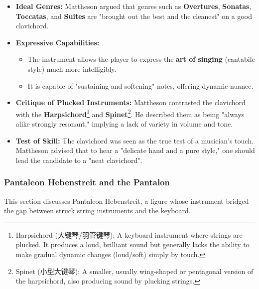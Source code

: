 \documentclass[math,code]{amznotes}
\theoremstyle{remark}
\begin{document}
\begin{itemize}
    \item \textbf{Ideal Genres:} Mattheson argued that genres such as \textbf{Overtures}, \textbf{Sonatas}, \textbf{Toccatas}, and \textbf{Suites} are "brought out the best and the cleanest" on a good clavichord.
    \item \textbf{Expressive Capabilities:}
    \begin{itemize}
        \item The instrument allows the player to express the \textbf{art of singing} (cantabile style) much more intelligibly.
        \item It is capable of "sustaining and softening" notes, offering dynamic nuance.
    \end{itemize}
    \item \textbf{Critique of Plucked Instruments:} Mattheson contrasted the clavichord with the \textbf{Harpsichord}\footnote{Harpsichord (大键琴/羽管键琴): A keyboard instrument where strings are plucked. It produces a loud, brilliant sound but generally lacks the ability to make gradual dynamic changes (loud/soft) simply by touch.} and \textbf{Spinet}\footnote{Spinet (小型大键琴): A smaller, usually wing-shaped or pentagonal version of the harpsichord, also producing sound by plucking strings.}. He described them as being "always alike strongly resonant," implying a lack of variety in volume and tone.
    \item \textbf{Test of Skill:} The clavichord was seen as the true test of a musician's touch. Mattheson advised that to hear a "delicate hand and a pure style," one should lead the candidate to a "neat clavichord".
\end{itemize}

\subsubsection{Pantaleon Hebenstreit and the Pantalon}

This section discusses Pantaleon Hebenstreit, a figure whose instrument bridged the gap between struck string instruments and the keyboard.
\end{document}
